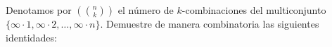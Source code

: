 Denotamos por $\left(\binom{n}{k}\right)$ el número de $k$-combinaciones del multiconjunto $\{\infty\cdot1,\infty\cdot2,\dots,\infty\cdot n\}$. Demuestre de manera combinatoria las siguientes identidades:

